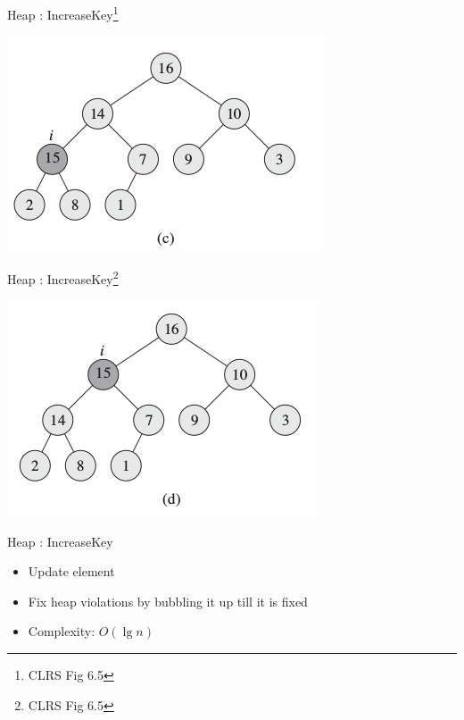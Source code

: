 \documentclass{beamer}
\begin{document}
\begin{frame}{Heap : IncreaseKey\footnote{CLRS Fig 6.5}}
    \begin{center}
        \includegraphics[scale=0.5]{heapIncreaseKey3.png}
    \end{center}
\end{frame}

\begin{frame}{Heap : IncreaseKey\footnote{CLRS Fig 6.5}}
    \begin{center}
        \includegraphics[scale=0.5]{heapIncreaseKey4.png}
    \end{center}
\end{frame}


\begin{frame}{Heap : IncreaseKey}
    \begin{itemize}
        \item Update element 
        \item Fix heap violations by bubbling it up till it is fixed
        \item Complexity: \pause $O(\lg n)$
    \end{itemize}
\end{frame}
\end{document}
